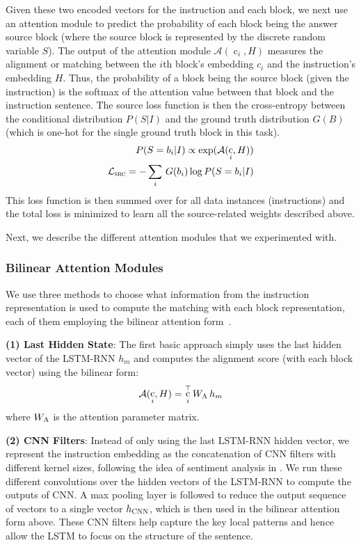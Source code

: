 \documentclass[letterpaper]{article} %
\DeclareMathOperator{\embb}{c}
\begin{document}
Given these two encoded vectors for the instruction and each block, we next use an attention module to predict the probability of each block being the answer source block (where the source block is represented by the discrete random variable $S$).
The output of the attention module $\mathcal{A}(\embb_i, H)$ measures the alignment or matching between the $i$th block's embedding $c_i$ and the instruction's embedding $H$.
Thus, the probability of a block being the source block (given the instruction) is the softmax of the attention value between that block and the instruction sentence.
%
The source loss function is then the cross-entropy between the conditional distribution $P(S|I)$ and the ground truth distribution $G(B)$ (which is one-hot for the single ground truth block in this task).
\begin{align}
P(S = b_i|I)  \propto \exp(\mathcal{A}(\embb_i, H))\\
\mathcal{L}_\textsc{src}  = -\sum_i\, G(b_i) \log P(S = b_i|I)
\end{align}
This loss function is then summed over for all data instances (instructions) and the total loss is minimized to learn all the source-related weights described above.

Next, we describe the different attention modules that we experimented with.

\subsubsection{Bilinear Attention Modules}
\label{sec:attn}
We use three methods to choose what information from the instruction representation is used to compute the matching with each block representation, each of them employing the bilinear attention form~\cite{luong2015effective}.

\textbf{(1) Last Hidden State}:
The first basic approach simply uses the last hidden vector of the LSTM-RNN $h_m$ and computes the alignment score (with each block vector) using the bilinear form:
\begin{equation}
\mathcal{A}(\embb_i, H) = \embb_i^{\top} W_{\textsc{A}} \, h_m
\end{equation}
where $W_{\textsc{A}}$ is the attention parameter matrix.


\textbf{(2) CNN Filters}:
Instead of only using the last LSTM-RNN hidden vector, we represent the instruction embedding as the concatenation of CNN filters with different kernel sizes, following the idea of sentiment analysis in \cite{kim2014convolutional}.
We run these different convolutions over the hidden vectors of the LSTM-RNN to compute the outputs of CNN. A max pooling layer is followed to reduce the output sequence of vectors to a single vector $h_{\textsc{CNN}}$, which is then used in the bilinear attention form above.
These CNN filters help capture the key local patterns and hence allow the LSTM to focus on the structure of the sentence.
\end{document}
